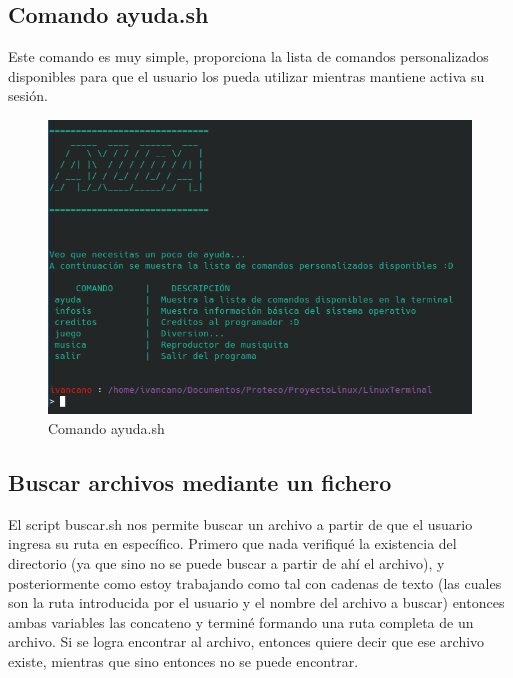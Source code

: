 \documentclass[letter,11pt]{article}
\begin{document}
\newpage
\subsection{Comando ayuda.sh}
Este comando es muy simple, proporciona la lista de comandos personalizados disponibles para que el usuario los pueda utilizar mientras mantiene activa su sesión.

\begin{figure} [H]
    \centering 
    \caption{Comando ayuda.sh}
    \includegraphics[scale=.6]{ayudaSH.png} 
\end{figure}

\subsection{Buscar archivos mediante un fichero}

El script buscar.sh nos permite buscar un archivo a partir de que el usuario ingresa su ruta en específico. Primero que nada verifiqué la existencia del directorio (ya que sino no se puede buscar a partir de ahí el archivo), y posteriormente como estoy trabajando como tal con cadenas de texto (las cuales son la ruta introducida por el usuario y el nombre del archivo a buscar) entonces ambas variables las concateno y terminé formando una ruta completa de un archivo. Si se logra encontrar al archivo, entonces quiere decir que ese archivo existe, mientras que sino entonces no se puede encontrar.
\end{document}

